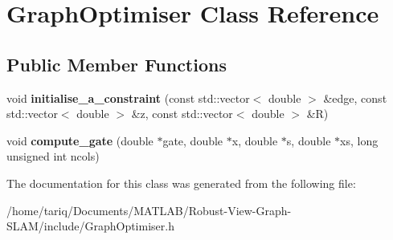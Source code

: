 \hypertarget{classGraphOptimiser}{}\section{Graph\+Optimiser Class Reference}
\label{classGraphOptimiser}
\subsection*{Public Member Functions}
\begin{DoxyCompactItemize}
\item 
void {\bfseries initialise\+\_\+a\+\_\+constraint} (const std\+::vector$<$ double $>$ \&edge, const std\+::vector$<$ double $>$ \&z, const std\+::vector$<$ double $>$ \&R)\hypertarget{classGraphOptimiser_ab58070fd7b8196c9e1bd7e41d2df0eca}{}\label{classGraphOptimiser_ab58070fd7b8196c9e1bd7e41d2df0eca}

\item 
void {\bfseries compute\+\_\+gate} (double $\ast$gate, double $\ast$x, double $\ast$s, double $\ast$xs, long unsigned int ncols)\hypertarget{classGraphOptimiser_a7be156050f369b6354a95b36ff12809c}{}\label{classGraphOptimiser_a7be156050f369b6354a95b36ff12809c}

\end{DoxyCompactItemize}


The documentation for this class was generated from the following file\+:\begin{DoxyCompactItemize}
\item 
/home/tariq/\+Documents/\+M\+A\+T\+L\+A\+B/\+Robust-\/\+View-\/\+Graph-\/\+S\+L\+A\+M/include/Graph\+Optimiser.\+h\end{DoxyCompactItemize}
